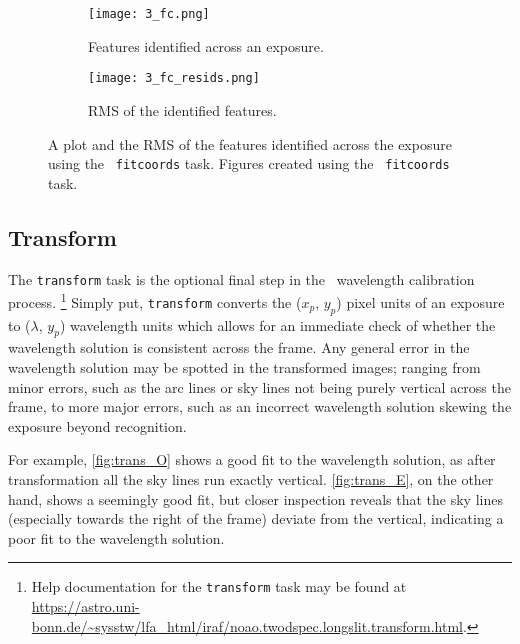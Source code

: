 \begin{figure}
    \centering
    \begin{subfigure}[b]{0.49\textwidth}
        \centering
        \texttt{[image: 3\_fc.png]}
        \caption{Features identified across an exposure.}
    \end{subfigure}
    \hfill
    \begin{subfigure}[b]{0.49\textwidth}
        \centering
        \texttt{[image: 3\_fc\_resids.png]}
        \caption{\gls{RMS} of the identified features.}
    \end{subfigure}
    \caption{A plot and the \gls{RMS} of the features identified across the exposure using the \iraf\ \texttt{fitcoords} task. Figures created using the \iraf\ \texttt{fitcoords} task.}
    \label{fig:iraf_fc_plot}
\end{figure}

\subsection{Transform} \label{subsec:iraf_transform}

The \texttt{transform} task is the optional final step in the \iraf\ wavelength calibration process.%
\footnote{Help documentation for the \texttt{transform} task may be found at \url{https://astro.uni-bonn.de/~sysstw/lfa_html/iraf/noao.twodspec.longslit.transform.html}.}
Simply put, \texttt{transform} converts the ($x_p$, $y_p$) pixel units of an exposure to ($\lambda$, $y_p$) wavelength units which allows for an immediate check of whether the wavelength solution is consistent across the frame. Any general error in the wavelength solution may be spotted in the transformed images; ranging from minor errors, such as the arc lines or sky lines not being purely vertical across the frame, to more major errors, such as an incorrect wavelength solution skewing the exposure beyond recognition.

For example, \autoref{fig:trans_O} shows a good fit to the wavelength solution, as after transformation all the sky lines run exactly vertical. \autoref{fig:trans_E}, on the other hand, shows a seemingly good fit, but closer inspection reveals that the sky lines (especially towards the right of the frame) deviate from the vertical, indicating a poor fit to the wavelength solution.

